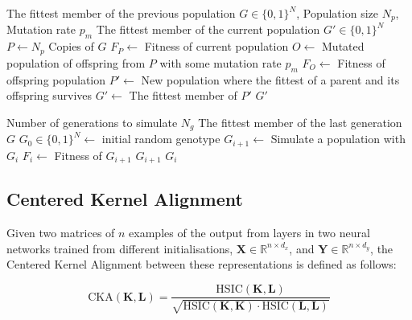 \documentclass[conference,compsoc]{IEEEtran}
\begin{document}
\begin{algorithm}[H]
\caption{Simulate evolution over a population}
\label{algo:simulate-single}
\begin{algorithmic}[1]
\REQUIRE The fittest member of the previous population \(G \in \{0, 1\}^N\), Population size \(N_p\), Mutation rate \(p_m\)
\ENSURE The fittest member of the current population \(G' \in \{0, 1\}^N\)
\STATE \(P \gets N_p\) Copies of \(G\)
\STATE \(F_P \gets\) Fitness of current population \COMMENT{\ref{algo:fitness}}
\STATE \(O \gets\) Mutated population of offspring from \(P\) with some mutation rate \(p_m\) \COMMENT{\ref{algo:mutate}}
\STATE \(F_O \gets\) Fitness of offspring population \COMMENT{\ref{algo:fitness}}
\STATE \(P' \gets\) New population where the fittest of a parent and its offspring survives 
\STATE \(G' \gets\) The fittest member of \(P'\)
\RETURN \(G'\)
\end{algorithmic}
\end{algorithm}

\begin{algorithm}[H]
\caption{Simulate the process of evolution over multiple generations}
\label{algo:simulate-full}
\begin{algorithmic}[1]
\REQUIRE Number of generations to simulate \(N_g\) 
\ENSURE The fittest member of the last generation \(G\) 
\STATE \(G_0 \in \{0, 1\}^N\gets\) initial random genotype 
\STATE \(G_{i + 1} \gets\) Simulate a population with \(G_i\) \COMMENT{\ref{algo:simulate-single}}
\STATE \(F_i \gets\) Fitness of \(G_{i + 1}\) \COMMENT{\ref{algo:fitness}}
\RETURN \(G_{i + 1}\) 
\ENDIF 
\ENDFOR
\RETURN \(G_i\)
\end{algorithmic}
\end{algorithm}


\subsection{Centered Kernel Alignment}\label{apdx:cka}

Given two matrices of \(n\) examples of the output from layers in two neural networks trained from different initialisations, \(\mathbf{X} \in \mathbb{R}^{n \times d_x}\), and \(\mathbf{Y} \in \mathbb{R}^{n \times d_y}\), the Centered Kernel Alignment between these representations is defined as follows: 

\begin{equation}
    \text{CKA}\left(\mathbf{K}, \mathbf{L}\right) = \frac{\text{HSIC}\left(\mathbf{K}, \mathbf{L}\right)}{\sqrt{\text{HSIC}\left(\mathbf{K}, \mathbf{K}\right) \cdot \text{HSIC}\left(\mathbf{L}, \mathbf{L}\right)}}\label{eq:cka}
\end{equation}
\end{document}
